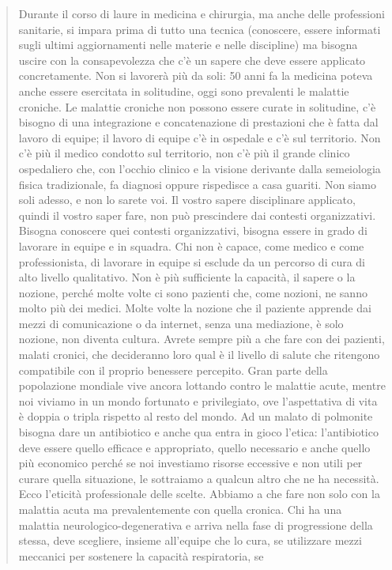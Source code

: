 \documentclass[]{article}
\begin{document}
\begin{quote}
Durante il corso di laure in medicina e chirurgia, ma anche delle
professioni sanitarie, si impara prima di tutto una tecnica (conoscere,
essere informati sugli ultimi aggiornamenti nelle materie e nelle
discipline) ma bisogna uscire con la consapevolezza che c'è un sapere
che deve essere applicato concretamente. Non si lavorerà più da soli: 50
anni fa la medicina poteva anche essere esercitata in solitudine, oggi
sono prevalenti le malattie croniche. Le malattie croniche non possono
essere curate in solitudine, c'è bisogno di una integrazione e
concatenazione di prestazioni che è fatta dal lavoro di equipe; il
lavoro di equipe c'è in ospedale e c'è sul territorio. Non c'è più il
medico condotto sul territorio, non c'è più il grande clinico
ospedaliero che, con l'occhio clinico e la visione derivante dalla
semeiologia fisica tradizionale, fa diagnosi oppure rispedisce a casa
guariti. Non siamo soli adesso, e non lo sarete voi. Il vostro sapere
disciplinare applicato, quindi il vostro saper fare, non può prescindere
dai contesti organizzativi. Bisogna conoscere quei contesti
organizzativi, bisogna essere in grado di lavorare in equipe e in
squadra. Chi non è capace, come medico e come professionista, di
lavorare in equipe si esclude da un percorso di cura di alto livello
qualitativo. Non è più sufficiente la capacità, il sapere o la nozione,
perché molte volte ci sono pazienti che, come nozioni, ne sanno molto
più dei medici. Molte volte la nozione che il paziente apprende dai
mezzi di comunicazione o da internet, senza una mediazione, è solo
nozione, non diventa cultura. Avrete sempre più a che fare con dei
pazienti, malati cronici, che decideranno loro qual è il livello di
salute che ritengono compatibile con il proprio benessere percepito.
Gran parte della popolazione mondiale vive ancora lottando contro le
malattie acute, mentre noi viviamo in un mondo fortunato e privilegiato,
ove l'aspettativa di vita è doppia o tripla rispetto al resto del mondo.
Ad un malato di polmonite bisogna dare un antibiotico e anche qua entra
in gioco l'etica: l'antibiotico deve essere quello efficace e
appropriato, quello necessario e anche quello più economico perché se
noi investiamo risorse eccessive e non utili per curare quella
situazione, le sottraiamo a qualcun altro che ne ha necessità. Ecco
l'eticità professionale delle scelte. Abbiamo a che fare non solo con la
malattia acuta ma prevalentemente con quella cronica. Chi ha una
malattia neurologico-degenerativa e arriva nella fase di progressione
della stessa, deve scegliere, insieme all'equipe che lo cura, se
utilizzare mezzi meccanici per sostenere la capacità respiratoria, se

\end{quote}
\end{document}
